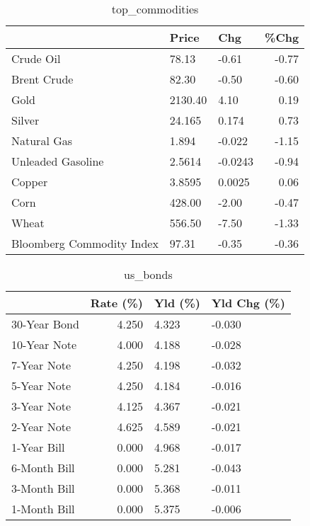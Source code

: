 \documentclass{article}%
\begin{document}
\begin{table}[htbp]%
\caption{top\_commodities}%
\centering%
\begin{adjustbox}{width=1\textwidth}%
\begin{tabular}{lllr}
\toprule
                          &   Price &     Chg &  \%Chg \\
\midrule
               Crude Oil  &   78.13 &   -0.61 & -0.77 \\
             Brent Crude  &   82.30 &   -0.50 & -0.60 \\
                    Gold  & 2130.40 &    4.10 &  0.19 \\
                  Silver  &  24.165 &   0.174 &  0.73 \\
             Natural Gas  &   1.894 &  -0.022 & -1.15 \\
       Unleaded Gasoline  &  2.5614 & -0.0243 & -0.94 \\
                  Copper  &  3.8595 &  0.0025 &  0.06 \\
                    Corn  &  428.00 &   -2.00 & -0.47 \\
                   Wheat  &  556.50 &   -7.50 & -1.33 \\
Bloomberg Commodity Index &   97.31 &   -0.35 & -0.36 \\
\bottomrule
\end{tabular}
%
\end{adjustbox}%
\end{table}

%


\begin{table}[htbp]%
\caption{us\_bonds}%
\centering%
\begin{adjustbox}{width=1\textwidth}%
\begin{tabular}{lrll}
\toprule
             &  Rate (\%) & Yld (\%) & Yld Chg (\%) \\
\midrule
30-Year Bond &     4.250 &   4.323 &      -0.030 \\
10-Year Note &     4.000 &   4.188 &      -0.028 \\
 7-Year Note &     4.250 &   4.198 &      -0.032 \\
 5-Year Note &     4.250 &   4.184 &      -0.016 \\
 3-Year Note &     4.125 &   4.367 &      -0.021 \\
 2-Year Note &     4.625 &   4.589 &      -0.021 \\
 1-Year Bill &     0.000 &   4.968 &      -0.017 \\
6-Month Bill &     0.000 &   5.281 &      -0.043 \\
3-Month Bill &     0.000 &   5.368 &      -0.011 \\
1-Month Bill &     0.000 &   5.375 &      -0.006 \\
\bottomrule
\end{tabular}
%
\end{adjustbox}%
\end{table}
\end{document}
